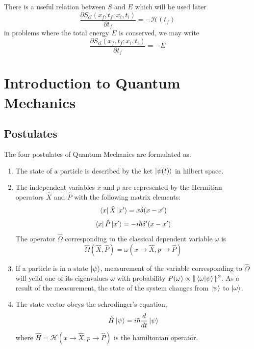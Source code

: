\documentclass[12pt,a4paper]{report}
\newcommand{\der}[2]{\frac{d#1}{d#2}}
\newcommand{\parder}[2]{\frac{\partial#1}{\partial#2}}
\newcommand{\hamiltonian}{\mathcal{H}}
\begin{document}
There is a useful relation between $S$ and $E$ which will be used later
\begin{equation*}
    \parder{S_{cl}(x_f, t_f;x_i, t_i)}{t_f} = -\hamiltonian(t_f)
\end{equation*}
in problems where the total energy $E$ is conserved, we may write
\begin{equation*}
    \parder{S_{cl}(x_f, t_f;x_i, t_i)}{t_f} = -E
\end{equation*}


\chapter{Introduction to Quantum Mechanics}

\section{Postulates}

The four postulates of Quantum Mechanics are formulated as:

\begin{enumerate}[label=\Roman*.]
    \item The state of a particle is described by the ket $\ket{\psi(t)}$ in hilbert space.
    \item The independent variables $x$ and $p$ are represented by the Hermitian operators $\hat{X}$ and $\hat{P}$ with the following matrix elements:
    \begin{equation*}
        \bra{x}\hat{X}\ket{x'} = x\delta(x-x')
    \end{equation*}
    \begin{equation*}
        \bra{x}\hat{P}\ket{x'} = -i\hbar \delta'(x-x')
    \end{equation*}
    The operator $\hat{\Omega}$ corresponding to the classical dependent variable $\omega$ is
    \begin{equation*}
        \hat{\Omega}(\hat{X}, \hat{P}) = \omega(x\to \hat{X}, p \to \hat{P})
    \end{equation*}

    \item If a particle is in a state $\ket{\psi}$, measurement of the variable corresponding to $\hat{\Omega}$
    will yeild one of its eigenvalues $\omega$ with probability $P(\omega) \propto \|\bra{\omega}\ket{\psi}\|^2$.
    As a result of the measurement, the state of the system changes from $\ket{\psi}$ to $\ket{\omega}$.

    \item The state vector obeys the schrodinger's equation,
    \begin{equation*}
        \hat{H}\ket{\psi} = i\hbar \der{}{t} \ket{\psi}
    \end{equation*}
    where $\hat{H} = \hamiltonian(x \to \hat{X}, p \to \hat{P})$ is the hamiltonian operator.
\end{enumerate}
\end{document}

